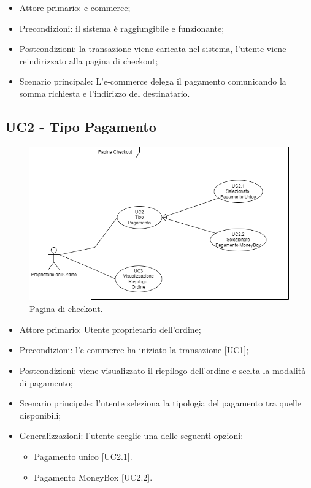 \begin{itemize}
    \item Attore primario: e-commerce\glo{};
    \item Precondizioni: il sistema è raggiungibile e funzionante;
    \item Postcondizioni: la transazione viene caricata nel sistema, l'utente viene reindirizzato alla pagina di checkout;
    \item Scenario principale: L'e-commerce\glo{} delega il pagamento comunicando la somma richiesta e l'indirizzo del destinatario.
\end{itemize}

\subsection{UC2 - Tipo Pagamento}\label{subsection: UC2}

\begin{figure}[H]
    \centering
    \includegraphics[scale=0.7]{immagini/UseCases-UC2-1.png}
    \caption{Pagina di checkout.}
\end{figure}

\begin{itemize}
    \item Attore primario: Utente proprietario dell'ordine;
    \item Precondizioni: l'e-commerce\glo{} ha iniziato la transazione [UC1];
    \item Postcondizioni: viene visualizzato il riepilogo dell'ordine e scelta la modalità di pagamento;
    \item Scenario principale: l'utente seleziona la tipologia del pagamento tra quelle disponibili;
    \item Generalizzazioni: l'utente sceglie una delle seguenti opzioni:
          \begin{itemize}
              \item Pagamento unico [UC2.1].
              \item Pagamento MoneyBox\glo{} [UC2.2].
          \end{itemize}
\end{itemize}
\clearpage

